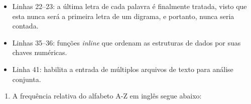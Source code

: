 \documentclass{../sftex/sftex}
\begin{document}
\begin{itemize}
    \item Linhas 22--23: a última letra de cada palavra é finalmente tratada,
        visto que esta nunca será a primeira letra de um digrama, e portanto,
        nunca seria contada.

    \item Linhas 35--36: funções \textit{inline} que ordenam as estruturas de
        dados por suas chaves numéricas.

    \item Linha 41: habilita a entrada de múltiplos arquivos de texto para
        análise conjunta.

\end{itemize}

\begin{enumerate}

    \item A frequência relativa do alfabeto A-Z em inglês segue abaixo:


\end{enumerate}
\end{document}
